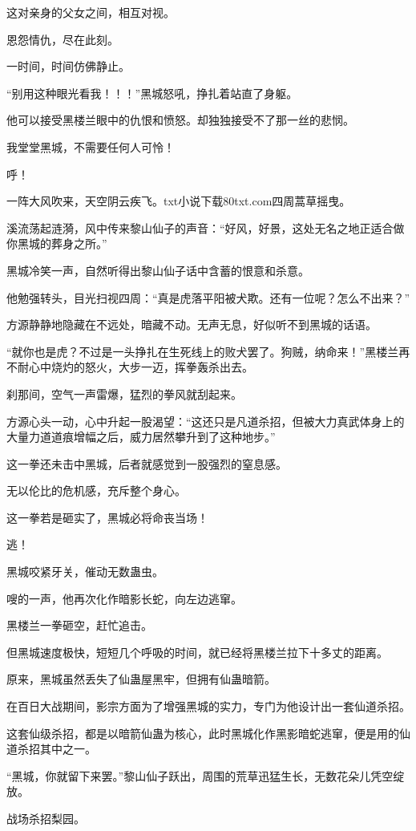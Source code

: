 \begin{this_body}
这对亲身的父女之间，相互对视。

恩怨情仇，尽在此刻。

一时间，时间仿佛静止。

“别用这种眼光看我！！！”黑城怒吼，挣扎着站直了身躯。

他可以接受黑楼兰眼中的仇恨和愤怒。却独独接受不了那一丝的悲悯。

我堂堂黑城，不需要任何人可怜！

呼！

一阵大风吹来，天空阴云疾飞。txt小说下载80txt.com四周蒿草摇曳。

溪流荡起涟漪，风中传来黎山仙子的声音：“好风，好景，这处无名之地正适合做你黑城的葬身之所。”

黑城冷笑一声，自然听得出黎山仙子话中含蓄的恨意和杀意。

他勉强转头，目光扫视四周：“真是虎落平阳被犬欺。还有一位呢？怎么不出来？”

方源静静地隐藏在不远处，暗藏不动。无声无息，好似听不到黑城的话语。

“就你也是虎？不过是一头挣扎在生死线上的败犬罢了。狗贼，纳命来！”黑楼兰再不耐心中烧灼的怒火，大步一迈，挥拳轰杀出去。

刹那间，空气一声雷爆，猛烈的拳风就刮起来。

方源心头一动，心中升起一股渴望：“这还只是凡道杀招，但被大力真武体身上的大量力道道痕增幅之后，威力居然攀升到了这种地步。”

这一拳还未击中黑城，后者就感觉到一股强烈的窒息感。

无以伦比的危机感，充斥整个身心。

这一拳若是砸实了，黑城必将命丧当场！

逃！

黑城咬紧牙关，催动无数蛊虫。

嗖的一声，他再次化作暗影长蛇，向左边逃窜。

黑楼兰一拳砸空，赶忙追击。

但黑城速度极快，短短几个呼吸的时间，就已经将黑楼兰拉下十多丈的距离。

原来，黑城虽然丢失了仙蛊屋黑牢，但拥有仙蛊暗箭。

在百日大战期间，影宗方面为了增强黑城的实力，专门为他设计出一套仙道杀招。

这套仙级杀招，都是以暗箭仙蛊为核心，此时黑城化作黑影暗蛇逃窜，便是用的仙道杀招其中之一。

“黑城，你就留下来罢。”黎山仙子跃出，周围的荒草迅猛生长，无数花朵儿凭空绽放。

战场杀招梨园。


\end{this_body}
